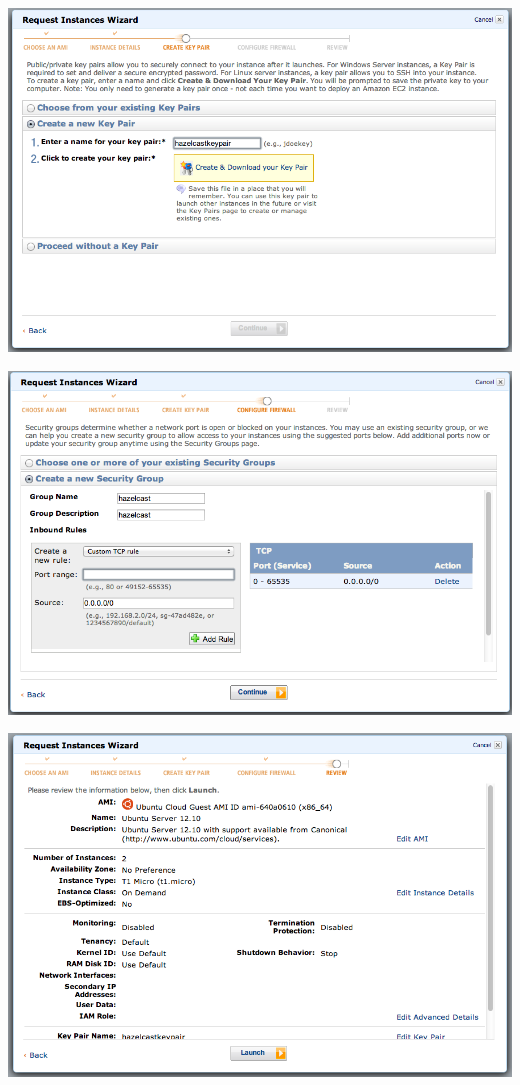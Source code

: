 \includegraphics[scale=0.40]{ec2-7.png}

\includegraphics[scale=0.40]{ec2-8.png}

\includegraphics[scale=0.40]{ec2-9.png}

